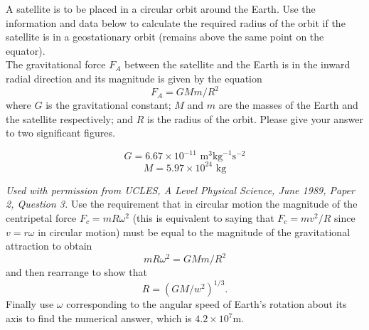 
\begin{problem}[A1989PSIIQ3l] 
{A satellite is to be placed in a circular orbit around the Earth. Use the information and data below to calculate the required radius of the orbit if the satellite is in a geostationary orbit (remains above the same point on the equator). \\ The gravitational force $F_A$ between the satellite and the Earth is in the inward radial direction and its magnitude is given by the equation 
\begin{equation*}
F_A=GMm/R^2
\end{equation*}
where $G$ is the gravitational constant; $M$ and $m$ are the masses of the Earth and the satellite respectively; and $R$ is the radius of the orbit. Please give your answer to two significant figures.

\begin{equation*}
G=6.67\times 10^{-11} \textrm{ m}^3\textrm{kg}^{-1}\textrm{s}^{-2}
\end{equation*}
\begin{equation*}
M=5.97\times 10^{24} \textrm{ kg}
\end{equation*}
} {\textit{Used with permission from UCLES, A Level Physical Science, June 1989, Paper 2, Question 3.}
}{
Use the requirement that in circular motion the magnitude of the centripetal force $F_c=mR\omega^2$ (this is equivalent to saying that $F_c=mv^2/R$ since $v=r\omega$ in circular motion) must be equal to the magnitude of the gravitational attraction to obtain \begin{equation*}
mR\omega^2=GMm/R^2
\end{equation*}
 and then rearrange to show that
 \begin{equation*}
{R={(GM/w^2)}^{1/3}.}
\end{equation*} 
Finally use $\omega$ corresponding to the angular speed of Earth's rotation about its axis to find the numerical answer, which is $4.2\times 10^7$m.}
\end{problem}
